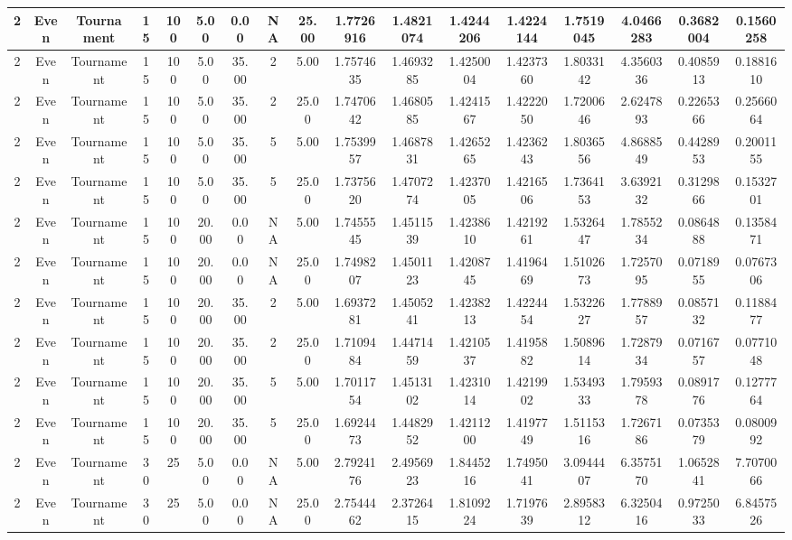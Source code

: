 \begin{longtable}{ | c | c | c | c | c | c | c | c | c | c | c | c | c | c | c | c | c | }
	\hline
	2	&	Even	&	Tournament	&	15	&	100	&	5.00	&	0.00	&	NA	&	25.00	&	1.7726916	&	1.4821074	&	1.4244206	&	1.4224144	&	1.7519045	&	4.0466283	&	0.3682004	&	0.1560258 \\
	\hline
	2	&	Even	&	Tournament	&	15	&	100	&	5.00	&	35.00	&	2	&	5.00	&	1.7574635	&	1.4693285	&	1.4250004	&	1.4237360	&	1.8033142	&	4.3560336	&	0.4085913	&	0.1881610 \\
	\hline
	2	&	Even	&	Tournament	&	15	&	100	&	5.00	&	35.00	&	2	&	25.00	&	1.7470642	&	1.4680585	&	1.4241567	&	1.4222050	&	1.7200646	&	2.6247893	&	0.2265366	&	0.2566064 \\
	\hline
	2	&	Even	&	Tournament	&	15	&	100	&	5.00	&	35.00	&	5	&	5.00	&	1.7539957	&	1.4687831	&	1.4265265	&	1.4236243	&	1.8036556	&	4.8688549	&	0.4428953	&	0.2001155 \\
	\hline
	2	&	Even	&	Tournament	&	15	&	100	&	5.00	&	35.00	&	5	&	25.00	&	1.7375620	&	1.4707274	&	1.4237005	&	1.4216506	&	1.7364153	&	3.6392132	&	0.3129866	&	0.1532701 \\
	\hline
	2	&	Even	&	Tournament	&	15	&	100	&	20.00	&	0.00	&	NA	&	5.00	&	1.7455545	&	1.4511539	&	1.4238610	&	1.4219261	&	1.5326447	&	1.7855234	&	0.0864888	&	0.1358471 \\
	\hline
	2	&	Even	&	Tournament	&	15	&	100	&	20.00	&	0.00	&	NA	&	25.00	&	1.7498207	&	1.4501123	&	1.4208745	&	1.4196469	&	1.5102673	&	1.7257095	&	0.0718955	&	0.0767306 \\
	\hline
	2	&	Even	&	Tournament	&	15	&	100	&	20.00	&	35.00	&	2	&	5.00	&	1.6937281	&	1.4505241	&	1.4238213	&	1.4224454	&	1.5322627	&	1.7788957	&	0.0857132	&	0.1188477 \\
	\hline
	2	&	Even	&	Tournament	&	15	&	100	&	20.00	&	35.00	&	2	&	25.00	&	1.7109484	&	1.4471459	&	1.4210537	&	1.4195882	&	1.5089614	&	1.7287934	&	0.0716757	&	0.0771048 \\
	\hline
	2	&	Even	&	Tournament	&	15	&	100	&	20.00	&	35.00	&	5	&	5.00	&	1.7011754	&	1.4513102	&	1.4231014	&	1.4219902	&	1.5349333	&	1.7959378	&	0.0891776	&	0.1277764 \\
	\hline
	2	&	Even	&	Tournament	&	15	&	100	&	20.00	&	35.00	&	5	&	25.00	&	1.6924473	&	1.4482952	&	1.4211200	&	1.4197749	&	1.5115316	&	1.7267186	&	0.0735379	&	0.0800992 \\
	\hline
	2	&	Even	&	Tournament	&	30	&	25	&	5.00	&	0.00	&	NA	&	5.00	&	2.7924176	&	2.4956923	&	1.8445216	&	1.7495041	&	3.0944407	&	6.3575170	&	1.0652841	&	7.7070066 \\
	\hline
	2	&	Even	&	Tournament	&	30	&	25	&	5.00	&	0.00	&	NA	&	25.00	&	2.7544462	&	2.3726415	&	1.8109224	&	1.7197639	&	2.8958312	&	6.3250416	&	0.9725033	&	6.8457526 \\

\end{longtable}
